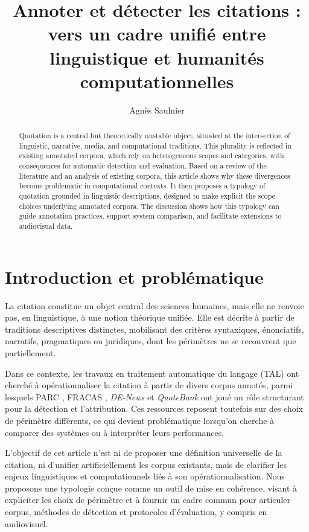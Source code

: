\documentclass[final,fra]{anthology-ch}         %
\title{Annoter et détecter les citations : vers un cadre unifié entre linguistique et humanités computationnelles}
\author[1]{Agnès Saulnier}[
  orcid=0009-0002-9715-1405,
  email=asaulnier@ina.fr
]
\affiliation{1}{Institut national de l’audiovisuel, Bry-sur-Marne, France}
\begin{document}
\maketitle

\begin{abstract}
Quotation is a central but theoretically unstable object, situated at
the intersection of linguistic, narrative, media, and computational
traditions. This plurality is reflected in existing annotated corpora,
which rely on heterogeneous scopes and categories, with consequences for
automatic detection and evaluation. Based on a review of the literature
and an analysis of existing corpora, this article shows why these
divergences become problematic in computational contexts. It then
proposes a typology of quotation grounded in linguistic descriptions,
designed to make explicit the scope choices underlying annotated
corpora. The discussion shows how this typology can guide annotation
practices, support system comparison, and facilitate extensions to
audiovisual data.
\end{abstract}

\section{Introduction et problématique}

La citation constitue un objet central des sciences humaines, mais elle
ne renvoie pas, en linguistique, à une notion théorique unifiée. Elle
est décrite à partir de traditions descriptives distinctes, mobilisant
des critères syntaxiques, énonciatifs, narratifs, pragmatiques ou
juridiques, dont les périmètres ne se recouvrent que partiellement.

Dans ce contexte, les travaux en traitement automatique du langage (TAL)
ont cherché à opérationnaliser la citation à partir de divers corpus
annotés, parmi lesquels PARC \cite{pareti2012database}, FRACAS \cite{richard2024fracas}, \textit{DE-News} \cite{petersenfrey2024dataset} et \textit{QuoteBank} \cite{vaucher2021quotebank} ont joué un rôle structurant pour la détection et
l'attribution. Ces ressources reposent toutefois sur des choix de
périmètre différents, ce qui devient problématique lorsqu'on cherche à
comparer des systèmes ou à interpréter leurs performances.

L'objectif de cet article n'est ni de proposer une définition
universelle de la citation, ni d'unifier artificiellement les corpus
existants, mais de clarifier les enjeux linguistiques et computationnels
liés à son opérationnalisation. Nous proposons une typologie conçue
comme un outil de mise en cohérence, visant à expliciter les choix de
périmètre et à fournir un cadre commun pour articuler corpus, méthodes
de détection et protocoles d'évaluation, y compris en audiovisuel.
\end{document}
